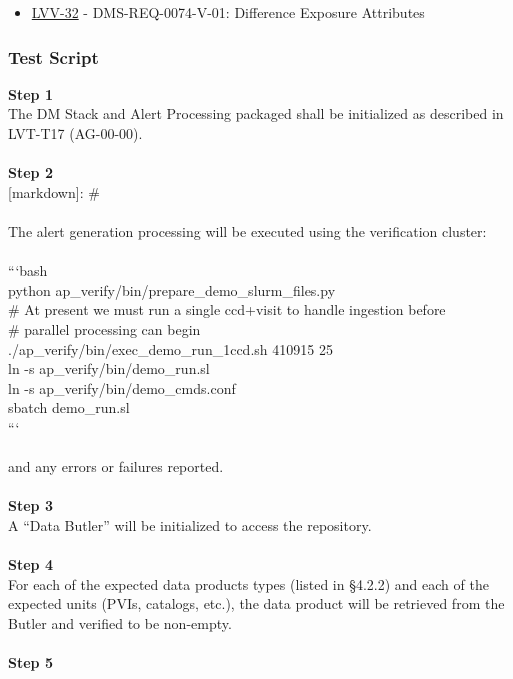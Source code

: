 \begin{itemize}
\tightlist
\item
  \href{https://jira.lsstcorp.org/browse/LVV-32}{LVV-32} -
  DMS-REQ-0074-V-01: Difference Exposure Attributes
\end{itemize}

\hypertarget{test-script-14}{%
\subsubsection{Test Script}\label{test-script-14}}

\textbf{Step 1}\\
The DM Stack and Alert Processing packaged shall be initialized as
described in LVT-T17 (AG-00-00).\\
~\\
\textbf{Step 2}\\
{[}markdown{]}: \#\\
~\\
The alert generation processing will be executed using the verification
cluster:\\
~\\
```bash\\
python ap\_verify/bin/prepare\_demo\_slurm\_files.py\\
\# At present we must run a single ccd+visit to handle ingestion
before\\
\# parallel processing can begin\\
./ap\_verify/bin/exec\_demo\_run\_1ccd.sh 410915 25\\
ln -s ap\_verify/bin/demo\_run.sl\\
ln -s ap\_verify/bin/demo\_cmds.conf\\
sbatch demo\_run.sl\\
```\\
~\\
and any errors or failures reported.\\
~\\
\textbf{Step 3}\\
A ``Data Butler'' will be initialized to access the repository.\\
~\\
\textbf{Step 4}\\
For each of the expected data products types (listed in §4.2.2) and each
of the expected units (PVIs, catalogs, etc.), the data product will be
retrieved from the Butler and verified to be non-empty.\\
~\\
\textbf{Step 5}\\
